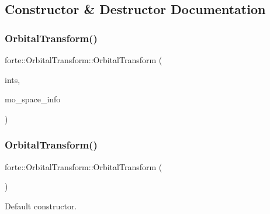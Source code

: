 \subsection{Constructor \& Destructor Documentation}
\mbox{\label{classforte_1_1_orbital_transform_ada3a71c5a0e8da563b984cfe6782e26f}} 
\subsubsection{\texorpdfstring{Orbital\+Transform()}{OrbitalTransform()}\hspace{0.1cm}{\footnotesize\ttfamily [1/2]}}
{\footnotesize\ttfamily forte\+::\+Orbital\+Transform\+::\+Orbital\+Transform (\begin{DoxyParamCaption}\item[{std\+::shared\+\_\+ptr$<$ \mbox{\hyperlink{classforte_1_1_forte_integrals}{Forte\+Integrals}} $>$}]{ints,  }\item[{std\+::shared\+\_\+ptr$<$ \mbox{\hyperlink{classforte_1_1_m_o_space_info}{M\+O\+Space\+Info}} $>$}]{mo\+\_\+space\+\_\+info }\end{DoxyParamCaption})}

\mbox{\label{classforte_1_1_orbital_transform_ad8deeadcd87504802278f656b9d8abcd}} 
\subsubsection{\texorpdfstring{Orbital\+Transform()}{OrbitalTransform()}\hspace{0.1cm}{\footnotesize\ttfamily [2/2]}}
{\footnotesize\ttfamily forte\+::\+Orbital\+Transform\+::\+Orbital\+Transform (\begin{DoxyParamCaption}{ }\end{DoxyParamCaption})\hspace{0.3cm}{\ttfamily [default]}}



Default constructor. 

